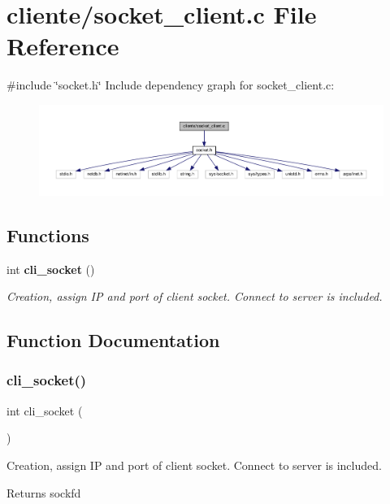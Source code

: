 \section{cliente/socket\+\_\+client.c File Reference}
\label{socket__client_8c}
{\ttfamily \#include \char`\"{}socket.\+h\char`\"{}}\newline
Include dependency graph for socket\+\_\+client.\+c\+:\nopagebreak
\begin{figure}[H]
\begin{center}
\leavevmode
\includegraphics[width=350pt]{socket__client_8c__incl}
\end{center}
\end{figure}
\subsection*{Functions}
\begin{DoxyCompactItemize}
\item 
int \textbf{ cli\+\_\+socket} ()
\begin{DoxyCompactList}\small\item\em Creation, assign IP and port of client socket. Connect to server is included. \end{DoxyCompactList}\end{DoxyCompactItemize}


\subsection{Function Documentation}
\mbox{\label{socket__client_8c_a9c129efbce40f3061d7899d2adf36a55}} 
\subsubsection{cli\+\_\+socket()}
{\footnotesize\ttfamily int cli\+\_\+socket (\begin{DoxyParamCaption}{ }\end{DoxyParamCaption})}



Creation, assign IP and port of client socket. Connect to server is included. 

\begin{DoxyReturn}{Returns}
sockfd 
\end{DoxyReturn}
